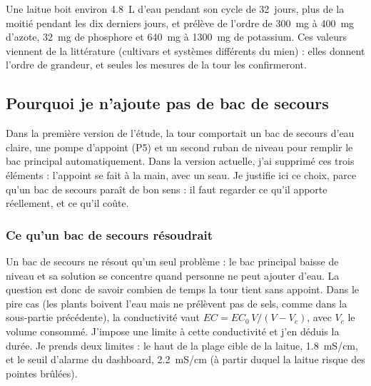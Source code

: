 \begin{aretenir}
Une laitue boit environ \qty{4,8}{L} d'eau pendant son cycle de \qty{32}{jours}, plus de la moitié pendant les dix derniers jours, et prélève de l'ordre de \qty{300}{mg} à \qty{400}{mg} d'azote, \qty{32}{mg} de phosphore et \qty{640}{mg} à \qty{1300}{mg} de potassium. Ces valeurs viennent de la littérature (cultivars et systèmes différents du mien) : elles donnent l'ordre de grandeur, et seules les mesures de la tour les confirmeront.
\end{aretenir}

\subsection{Pourquoi je n'ajoute pas de bac de secours}

Dans la première version de l'étude, la tour comportait un bac de secours d'eau claire, une pompe d'appoint (P5) et un second ruban de niveau pour remplir le bac principal automatiquement. Dans la version actuelle, j'ai supprimé ces trois éléments : l'appoint se fait à la main, avec un seau. Je justifie ici ce choix, parce qu'un bac de secours paraît de bon sens : il faut regarder ce qu'il apporte réellement, et ce qu'il coûte.

\subsubsection*{Ce qu'un bac de secours résoudrait}

Un bac de secours ne résout qu'un seul problème : le bac principal baisse de niveau et sa solution se concentre quand personne ne peut ajouter d'eau. La question est donc de savoir combien de temps la tour tient sans appoint. Dans le pire cas (les plants boivent l'eau mais ne prélèvent pas de sels, comme dans la sous-partie précédente), la conductivité vaut $EC = EC_0\,V/(V - V_c)$, avec $V_c$ le volume consommé. J'impose une limite à cette conductivité et j'en déduis la durée. Je prends deux limites : le haut de la plage cible de la laitue, \qty{1,8}{mS/cm}, et le seuil d'alarme du dashboard, \qty{2,2}{mS/cm} (à partir duquel la laitue risque des pointes brûlées).

